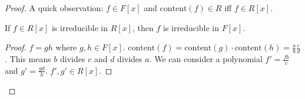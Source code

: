 \documentclass[a4paper,twoside,master.tex]{subfiles}
\begin{document}
\begin{proof}
    A quick observation: $ f \in F[x] $ and $ \text{content}(f) \in R $ iff $ f \in R[x] $.
    \begin{theorem}
        If $ f \in R[x] $ is irreducible in $ R[x] $, then $ f $ is irreducible in $ F[x] $.
    \end{theorem}
    \begin{proof}
        $ f = gh $ where $ g,h \in F[x] $. $ \text{content}(f) = \text{content}(g) \cdot \text{content}(h) = \frac{a}{b} \frac{c}{d} $. This means $ b $ divides $ c $ and $ d $ divides $ a $. We can consider a polynomial $ f' = \frac{f b}{c} $ and $ g' = \frac{g d}{b} $. $ f', g' \in R[x] $.
    \end{proof}
\end{proof}
\end{document}

